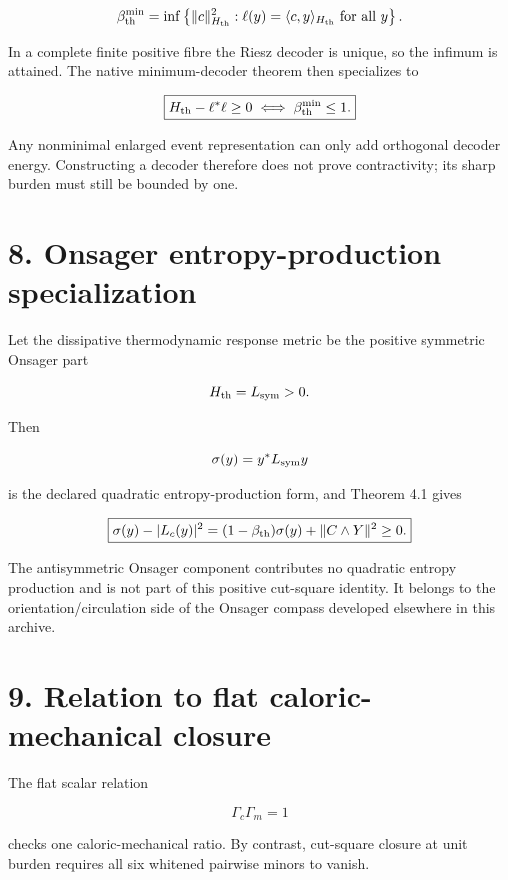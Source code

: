 \[
\beta_{\rm th}^{\min}
=
\inf\left\{
\|c\|_{H_{\rm th}}^2:
\ell(y)=\langle c,y\rangle_{H_{\rm th}}
\text{ for all }y
\right\}.
\]

In a complete finite positive fibre the Riesz decoder is unique, so the infimum is attained. The native minimum-decoder theorem then specializes to

\[
\boxed{
H_{\rm th}-\ell^*\ell\ge0
\iff
\beta_{\rm th}^{\min}\le1.
}
\]

Any nonminimal enlarged event representation can only add orthogonal decoder energy. Constructing a decoder therefore does not prove contractivity; its sharp burden must still be bounded by one.

\hypertarget{onsager-entropy-production-specialization}{%
\section{8. Onsager entropy-production specialization}\label{onsager-entropy-production-specialization}}

Let the dissipative thermodynamic response metric be the positive symmetric Onsager part

\[
H_{\rm th}=L_{\rm sym}>0.
\]

Then

\[
\sigma(y)=y^*L_{\rm sym}y
\]

is the declared quadratic entropy-production form, and Theorem 4.1 gives

\[
\boxed{
\sigma(y)-|L_c(y)|^2
=
(1-\beta_{\rm th})\sigma(y)
+
\|C\wedge Y\|^2
\ge0.
}
\]

The antisymmetric Onsager component contributes no quadratic entropy production and is not part of this positive cut-square identity. It belongs to the orientation/circulation side of the Onsager compass developed elsewhere in this archive.

\hypertarget{relation-to-flat-caloric-mechanical-closure}{%
\section{9. Relation to flat caloric-mechanical closure}\label{relation-to-flat-caloric-mechanical-closure}}

The flat scalar relation

\[
\Gamma_c\Gamma_m=1
\]

checks one caloric-mechanical ratio. By contrast, cut-square closure at unit burden requires all six whitened pairwise minors to vanish.

